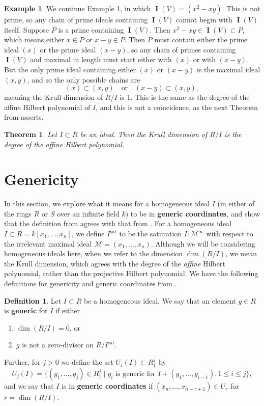 \documentclass[11pt]{article}
\newcommand{\sat}{^{\text{sat}}}
\DeclareMathOperator{\I}{\mathbf{I}}
\newtheorem{theorem}{Theorem}
\theoremstyle{definition}
\newtheorem{definition}{Definition}
\newtheorem{example}{Example}
\begin{document}
\begin{example}
	We continue Example 1, in which $\I(V) = (x^2 - xy)$. This is not prime, so any chain of prime ideals containing $\I(V)$ cannot begin with $\I(V)$ itself. Suppose $P$ is a prime containing $\I(V)$. Then $x^2 - xy \in \I(V) \subset P$, which means either $x \in P$ or $x - y \in P$. Then $P$ must contain either the prime ideal $(x)$ or the prime ideal $(x - y)$, so any chain of primes containing $\I(V)$ and maximal in length must start either with $(x)$ or with $(x - y)$. But the only prime ideal containing either $(x)$ or $(x - y)$ is the maximal ideal $(x,y)$, and so the only possible chains are \[ (x) \subset (x,y) \quad \text{or} \quad (x - y) \subset (x,y), \] meaning the Krull dimension of $R/I$ is 1. This is the same as the degree of the affine Hilbert polynomial of $I$, and this is not a coincidence, as the next Theorem from \cite{kemper2011course} asserts. 
\end{example}


\begin{theorem}
	Let $I \subset R$ be an ideal. Then the Krull dimension of $R/I$ is the degree of the affine Hilbert polynomial. 
\end{theorem}


\section*{Genericity}{}

In this section, we explore what it means for a homogeneous ideal $I$ (in either of the rings $R$ or $S$ over an infinite field $k$) to be in \textbf{generic coordinates}, and show that the definition from \cite{caminata2020solving} agrees with that from \cite{bayer1987criterion}. For a homogeneous ideal $I \subset R = k[x_1, \dots, x_n]$, we define $I\sat$ to be the saturation $I:\mathscr{M}^\infty$ with respect to the irrelevant maximal ideal $\mathscr{M} = (x_1, \dots, x_n)$. Although we will be considering homogeneous ideals here, when we refer to the dimension $\dim(R/I)$, we mean the Krull dimension, which agrees with the degree of the \emph{affine} Hilbert polynomial, rather than the projective Hilbert polynomial. We have the following definitions for genericity and generic coordinates from \cite{bayer1987criterion}. 


\begin{definition}
	Let $I \subset R$ be a homogeneous ideal. We say that an element $g \in R$ is \textbf{generic} for $I$ if either \begin{enumerate}[noitemsep, label = (\arabic*)]
		\item $\dim(R/I) = 0$, or
		\item $g$ is not a zero-divisor on $R/I\sat$. 
	\end{enumerate} Further, for $j > 0$ we define the set $U_j(I) \subset R_1^j$ by \[ U_j(I) = \{(g_1, \dots, g_j) \in R_1^j \mid g_i \text{ is generic for } I + (g_1, \dots, g_{i - 1}), 1 \leq i \leq j\}, \] and we say that $I$ is in \textbf{generic coordinates} if $(x_n, \dots, x_{n - r + 1}) \in U_r$ for $r = \dim(R/I)$. 
\end{definition}
\end{document}
